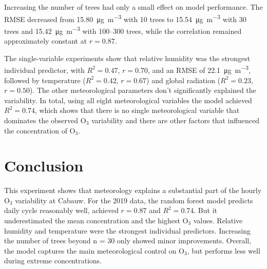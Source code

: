 \documentclass[10pt,a4paper]{article}
\begin{document}
Increasing the number of trees had only a small effect on model performance. The RMSE decreased from \SI{15.80}{\micro\gram\per\cubic\metre} with 10 trees to \SI{15.54}{\micro\gram\per\cubic\metre} with 30 trees and \SI{15.42}{\micro\gram\per\cubic\metre} with 100--300 trees, while the correlation remained approximately constant at $r=0.87$.

The single-variable experiments show that relative humidity was the strongest individual predictor, with $R^2=0.47$, $r=0.70$, and an RMSE of \SI{22.1}{\micro\gram\per\cubic\metre}, followed by temperature ($R^2=0.42$, $r=0.67$) and global radiation ($R^2=0.23$, $r=0.50$). The other meteorological parameters don't significantly explained the variability. In total, using all eight meteorological variables the model achieved $R^2=0.74$, which shows that there is no single meteorological variable that dominates the observed O$_3$ variability and there are other factors that influenced the concentration of O$_3$.

\section*{Conclusion}

This experiment shows that meteorology explains a substantial part of the hourly O$_3$ variability at Cabauw. For the 2019 data, the random forest model predicts daily cycle reasonably well, achieved $r=0.87$ and $R^2=0.74$. But it underestimated the mean concentration and the highest O$_3$ values. Relative humidity and temperature were the strongest individual predictors. Increasing the number of trees beyond n = 30 only showed minor improvements. Overall, the model captures the main meteorological control on O$_3$, but performs less well during extreme concentrations.
\end{document}
